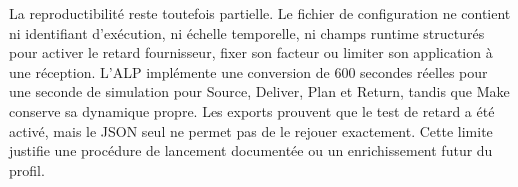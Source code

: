 La reproductibilité reste toutefois partielle. Le fichier de configuration ne contient ni identifiant d'exécution, ni échelle temporelle, ni champs runtime structurés pour activer le retard fournisseur, fixer son facteur ou limiter son application à une réception. L'ALP implémente une conversion de 600 secondes réelles pour une seconde de simulation pour Source, Deliver, Plan et Return, tandis que Make conserve sa dynamique propre. Les exports prouvent que le test de retard a été activé, mais le JSON seul ne permet pas de le rejouer exactement. Cette limite justifie une procédure de lancement documentée ou un enrichissement futur du profil.
